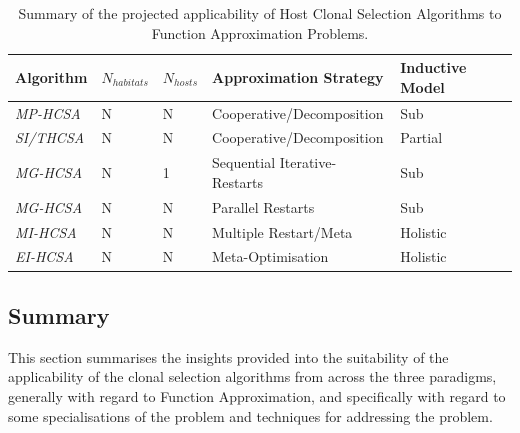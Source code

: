 \begin{table}[htp]
	\centering\small
		\begin{tabular}{lllll}
		\toprule
		\textbf{Algorithm} & \textbf{$N_{habitats}$} & \textbf{$N_{hosts}$} & \textbf{Approximation Strategy} & \textbf{Inductive Model} \\ 
		\toprule	
		\emph{MP-HCSA}   & N & N & Cooperative/Decomposition & Sub \\ 		
		\emph{SI/THCSA}	 & N & N & Cooperative/Decomposition & Partial \\		
		\emph{MG-HCSA} 	 & N & 1 & Sequential Iterative-Restarts & Sub \\ 
		\emph{MG-HCSA}   & N & N & Parallel Restarts & Sub \\ 		
		\emph{MI-HCSA}   & N & N & Multiple Restart/Meta & Holistic \\ 
		\emph{EI-HCSA}   & N & N & Meta-Optimisation & Holistic \\ 		
		\bottomrule
		\end{tabular}
	\caption{Summary of the projected applicability of Host Clonal Selection Algorithms to Function Approximation Problems.}
	\label{tab:iidle:function:approximation:hosts}
\end{table}

%
%
\subsection{Summary}
\label{subsec:iidle:function:approximation:summary}
This section summarises the insights provided into the suitability of the applicability of the clonal selection algorithms from across the three paradigms, generally with regard to Function Approximation, and specifically with regard to some specialisations of the problem and techniques for addressing the problem.

